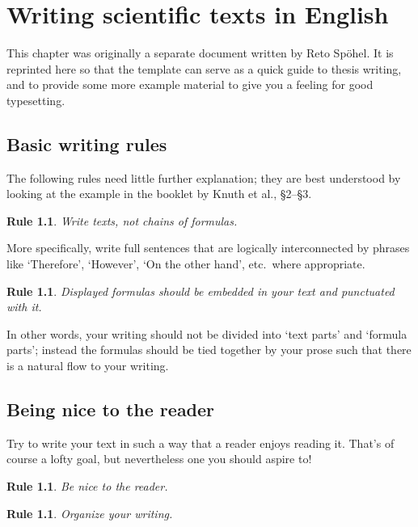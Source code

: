 \chapter{Writing scientific texts in English}

This chapter was originally a separate document written by Reto
Spöhel.  It is reprinted here so that the template can serve as a
quick guide to thesis writing, and to provide some more example
material to give you a feeling for good typesetting.

\theoremstyle{plain}
\theoremsymbol{}
\newtheorem{Rule}[theorem]{Rule}

\section{Basic writing rules}

The following rules need little further explanation; they are best
understood by looking at the example in the booklet by Knuth et al.,
§2--§3.

\begin{Rule}
  Write texts, not chains of formulas.
\end{Rule}

More specifically, write full sentences that are logically
interconnected by phrases like `Therefore', `However', `On the other
hand', etc.\ where appropriate.

\begin{Rule}
  Displayed formulas should be embedded in your text and punctuated
  with it.
\end{Rule}

In other words, your writing should not be divided into `text parts'
and `formula parts'; instead the formulas should be tied together by
your prose such that there is a natural flow to your writing.

\section{Being nice to the reader}

Try to write your text in such a way that a reader enjoys reading
it. That's of course a lofty goal, but nevertheless one you should
aspire to!

\begin{Rule}
  Be nice to the reader.
\end{Rule}


\begin{Rule}
  Organize your writing.
\end{Rule}

